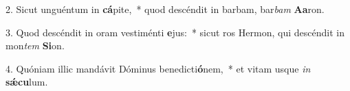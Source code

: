 2. Sicut unguéntum in \textbf{cá}pite,~*  quod descéndit in barbam, bar\textit{bam} \textbf{A}\textbf{a}ron.\

3. Quod descéndit in oram vestiménti \textbf{e}jus:~*  sicut ros Hermon, qui descéndit in mon\textit{tem} \textbf{Si}on.\

4. Quóniam illic mandávit Dóminus benedicti\textbf{ó}nem,~*  et vitam usque \textit{in} \textbf{sǽ}\textbf{cu}lum.\

